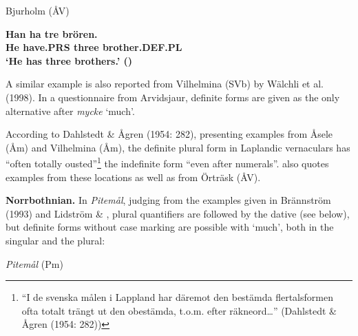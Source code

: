 Bjurholm (ÅV)



 \ea\label{}\gll\bfseries
Han  ha  tre  brören.\\

\bfseries
He  have.PRS  three  brother.DEF.PL\\

\glt ‘He has three brothers.’ (\citet[24]{BergholmEtAl1999})

\z

A similar example is also reported from Vilhelmina (SVb) by Wälchli et al. (1998). In a questionnaire from Arvidsjaur, definite forms are given as the only alternative after \textit{mycke} ‘much’. 


According to Dahlstedt \& Ågren (1954: 282), presenting examples from Åsele (Åm) and Vilhelmina (Åm), the definite plural form in Laplandic vernaculars has “often totally ousted”\footnote{ “I de svenska målen i Lappland har däremot den bestämda flertalsformen ofta totalt trängt ut den obestämda, t.o.m. efter räkneord…” (Dahlstedt \& Ågren (1954: 282))} the indefinite form “even after numerals”.  \citet[17]{Delsing2003a} also quotes examples from these locations as well as from Örträsk (ÅV). 


\textbf{Norrbothnian.} In \textit{Pitemål}, judging from the examples given in Brännström (1993) and Lidström \& \citet{Berglund1991}, plural quantifiers are followed by the dative (see below), but definite forms without case marking are possible with  ‘much’, both in the singular and the plural:


\item 

\textit{Pitemål} (Pm)


